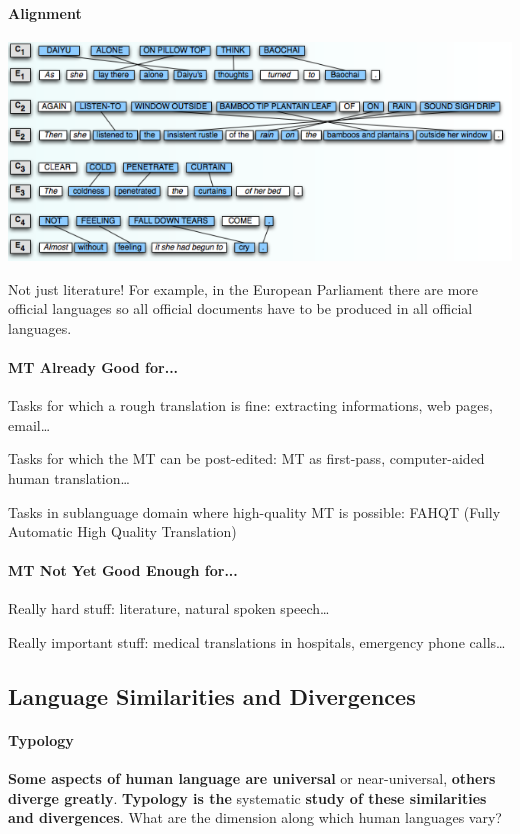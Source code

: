 \documentclass[10pt]{report}
\begin{document}
\paragraph{Alignment}
\begin{center}
	\includegraphics[scale=0.5]{61.png}
\end{center}
Not just literature! For example, in the European Parliament there are more official languages so all official documents have to be produced in all official languages.
\paragraph{MT Already Good for...}\begin{list}{}{}
	\item Tasks for which a rough translation is fine: extracting informations, web pages, email\ldots
	\item Tasks for which the MT can be post-edited: MT as first-pass, computer-aided human translation\ldots
	\item Tasks in sublanguage domain where high-quality MT is possible: FAHQT (Fully Automatic High Quality Translation)
\end{list}
\paragraph{MT Not Yet Good Enough for...}\begin{list}{}{}
	\item Really hard stuff: literature, natural spoken speech\ldots
	\item Really important stuff: medical translations in hospitals, emergency phone calls\ldots
\end{list}
\subsection{Language Similarities and Divergences}
\paragraph{Typology} \textbf{Some aspects of human language are universal} or near-universal, \textbf{others diverge greatly}. \textbf{Typology is the} systematic \textbf{study of these similarities and divergences}. What are the dimension along which human languages vary?
\end{document}
